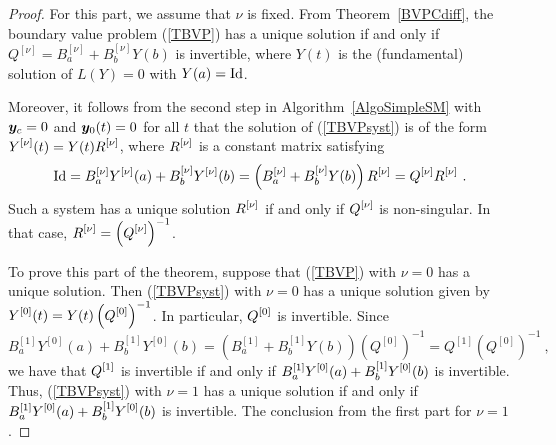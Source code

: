 \begin{proof}
For this part, we assume that $\nu$ is fixed.  From
Theorem~\ref{BVPCdiff}, the boundary value problem (\ref{TBVP}) 
has a unique solution if and only if
$Q^{[\nu]}= B_a^{[\nu]} +B_b^{[\nu]}Y(b)$ is invertible, where $Y(t)$
is the (fundamental) solution of $L(Y)=0$ with $Y(a) = \operatorname{Id}$.

Moreover, it follows from the second step in Algorithm~\ref{AlgoSimpleSM}
with $\bm{y}_c = 0$ and $\bm{y}_0(t) = 0$ for all $t$ that 
the solution of (\ref{TBVPsyst}) is of the form
$\displaystyle Y^{[\nu]}(t) = Y(t) R^{[\nu]}$, where
$\displaystyle R^{[\nu]}$ is a constant matrix satisfying
\[
\operatorname{Id} = B_a^{[\nu]}Y^{[\nu]}(a) + B_b^{[\nu]}Y^{[\nu]}(b) =
\left( B_a^{[\nu]} + B_b^{[\nu]} Y(b) \right)R^{[\nu]} = Q^{[\nu]}
R^{[\nu]} \ .
\]
Such a system has a unique solution $\displaystyle R^{[\nu]}$ if and only if
$\displaystyle Q^{[\nu]}$ is non-singular.  In that case,
$\displaystyle R^{[\nu]} = \left(Q^{[\nu]}\right)^{-1}$.

 To prove this part of the theorem, suppose that
(\ref{TBVP}) with $\nu =0$ has a unique solution.  Then
(\ref{TBVPsyst}) with $\nu=0$ has a unique solution given by
$\displaystyle Y^{[0]}(t) = Y(t) \left(Q^{[0]}\right)^{-1}$.  In particular, 
$\displaystyle Q^{[0]}$ is invertible.  Since
\[
B_a^{[1]}Y^{[0]}(a) + B_b^{[1]}Y^{[0]}(b)
= \left( B_a^{[1]} + B_b^{[1]} Y(b) \right)
\left(Q^{[0]}\right)^{-1} = Q^{[1]}\left(Q^{[0]}\right)^{-1} \ ,
\]
we have that $\displaystyle Q^{[1]}$ is invertible if and only if
$\displaystyle B_a^{[1]}Y^{[0]}(a) + B_b^{[1]}Y^{[0]}(b)$ is invertible.  Thus,
(\ref{TBVPsyst}) with $\nu=1$ has a unique solution if and only if
$\displaystyle B_a^{[1]}Y^{[0]}(a) + B_b^{[1]}Y^{[0]}(b)$ is invertible.  The
conclusion from the first part for $\nu =1$.
\end{proof}

